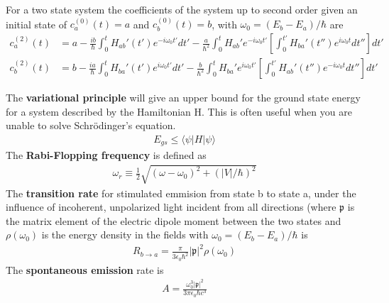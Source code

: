 For a two state system the coefficients of the system up to second order given an initial state of $c_a^{(0)}(t)=a$ and $c_b^{(0)}(t)=b$, with $\omega_0=(E_b-E_a)/\hbar$ are
\begin{align}
	c_a^{(2)}(t) &= a-\frac{ib}{\hbar}\int_{0}^{t}H_{ab}'(t')e^{-i \omega_0 t'}dt' - \frac{a}{\hbar^2}\int_{0}^{t}H_{ab}'e^{-i\omega_0 t'} \left[\int_{0}^{t'}H_{ba}'(t'')e^{i\omega_0 t}dt''\right]dt' \\
	c_b^{(2)}(t) &= b-\frac{ia}{\hbar}\int_{0}^{t}H_{ba}'(t')e^{i \omega_0 t'}dt' - \frac{b}{\hbar^2}\int_{0}^{t}H_{ba}'e^{i\omega_0 t'} \left[\int_{0}^{t'}H_{ab}'(t'')e^{-i\omega_0 t}dt''\right]dt'
\end{align}

The \textbf{variational principle} will give an upper bound for the ground state energy for a system described by the Hamiltonian H. This is often useful when you are unable to solve Schr\"{o}dinger's equation.
\begin{align}
	E_{gs} \leq \langle \psi|H|\psi\rangle
\end{align}
The \textbf{Rabi-Flopping frequency} is defined as
\begin{align}
	\omega_r \equiv \frac{1}{2}\sqrt{(\omega-\omega_0)^2+(|V|/\hbar)^2}
\end{align}
The \textbf{transition rate} for stimulated emmision from state b to state a, under the influence of incoherent, unpolarized light incident from all directions (where $\mathfrak{p}$ is the matrix element of the electric dipole moment between the two states and $\rho(\omega_0)$ is the energy density in the fields with $\omega_0=(E_b-E_a)/\hbar$ \cite{bib:Griffiths_QM} is
\begin{align}
	R_{b\rightarrow a} = \frac{\pi}{3\epsilon_0 \hbar^2}|\mathfrak{p}|^2\rho(\omega_0)
\end{align} 
The \textbf{spontaneous emission} rate is
\begin{align}
	A=\frac{\omega_0^3|\mathfrak{p}|^2}{3\pi\epsilon_0\hbar c^3}
\end{align}

